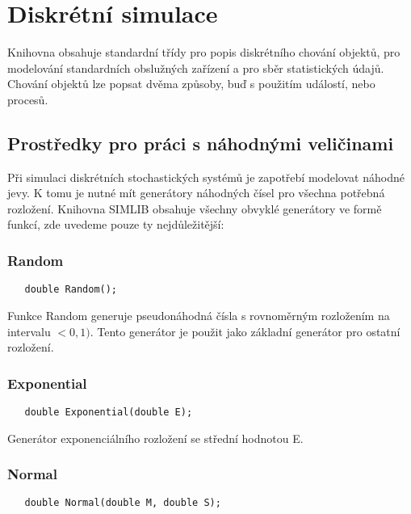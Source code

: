 \documentclass[a4paper]{article}
\begin{document}


\section{Diskrétní simulace}

Knihovna obsahuje standardní třídy pro popis diskrétního chování
objektů, pro modelování standardních obslužných zařízení a pro
sběr statistických údajů. Chování objektů lze popsat dvěma
způsoby, buď s použitím událostí, nebo procesů.


\subsection{Prostředky pro práci s náhodnými veličinami}

Při simulaci diskrétních stochastických systémů je zapotřebí
modelovat náhodné jevy. K tomu je nutné mít generátory náhodných
čísel pro všechna potřebná rozložení. Knihovna SIMLIB obsahuje
všechny obvyklé generátory ve formě funkcí, zde uvedeme pouze ty
nejdůležitější:

\subsubsection{Random}

\begin{verbatim}
   double Random();
\end{verbatim}

Funkce Random generuje pseudonáhodná čísla s rovnoměrným
rozložením na intervalu $<0,1)$. Tento generátor je použit jako
základní generátor pro ostatní rozložení.

\subsubsection{Exponential}

\begin{verbatim}
   double Exponential(double E);
\end{verbatim}

Generátor exponenciálního rozložení se střední hodnotou  E.

\subsubsection{Normal}

\begin{verbatim}
   double Normal(double M, double S);
\end{verbatim}
\end{document}
